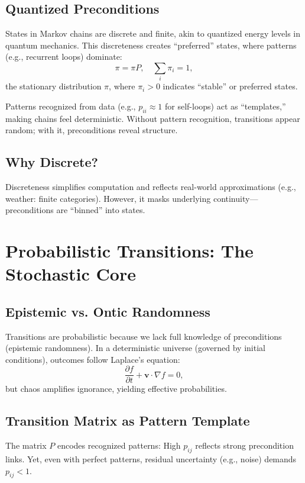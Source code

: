 	\subsection{Quantized Preconditions}
	States in Markov chains are discrete and finite, akin to quantized energy levels in quantum mechanics. This discreteness creates ``preferred'' states, where patterns (e.g., recurrent loops) dominate:
	\begin{equation}
		\pi = \pi P, \quad \sum_i \pi_i = 1,
	\end{equation}
	the stationary distribution $\pi$, where $\pi_i > 0$ indicates ``stable'' or preferred states.
	
	Patterns recognized from data (e.g., $p_{ii} \approx 1$ for self-loops) act as ``templates,'' making chains feel deterministic. Without pattern recognition, transitions appear random; with it, preconditions reveal structure.
	
	\subsection{Why Discrete?}
	Discreteness simplifies computation and reflects real-world approximations (e.g., weather: finite categories). However, it masks underlying continuity—preconditions are ``binned'' into states.
	
	\section{Probabilistic Transitions: The Stochastic Core}
	\label{sec:probabilistic}
	
	\subsection{Epistemic vs. Ontic Randomness}
	Transitions are probabilistic because we lack full knowledge of preconditions (epistemic randomness). In a deterministic universe (governed by initial conditions), outcomes follow Laplace's equation:
	\begin{equation}
		\frac{\partial f}{\partial t} + \mathbf{v} \cdot \nabla f = 0,
	\end{equation}
	but chaos amplifies ignorance, yielding effective probabilities.
	
	\subsection{Transition Matrix as Pattern Template}
	The matrix $P$ encodes recognized patterns: High $p_{ij}$ reflects strong precondition links. Yet, even with perfect patterns, residual uncertainty (e.g., noise) demands $p_{ij} < 1$.
	
